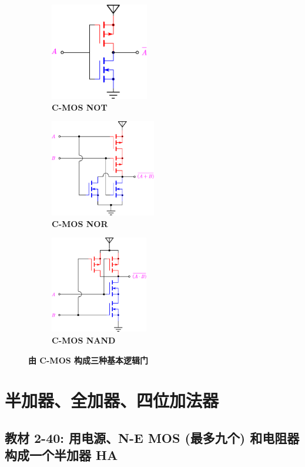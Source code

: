 \documentclass[UTF8]{report}
\theoremstyle{MyLineTheoremStyle} %
\theoremstyle{MyBlockTheoremStyle} %
\theoremstyle{MySubsubsectionStyle} %
\begin{document}
\begin{figure}[H]\centering
    \begin{subfigure}[t]{0.33\columnwidth}\centering
        \includegraphics[height=120pt]{assets/5/CMOS NOT.pdf}
        \caption{\bfseries C-MOS NOT }
    \end{subfigure}\hfill
    \begin{subfigure}[t]{0.33\columnwidth}\centering
        \includegraphics[height=120pt]{assets/5/CMOS NOR.pdf}
        \caption{\bfseries C-MOS NOR }
    \end{subfigure}
    \begin{subfigure}[t]{0.33\columnwidth}\centering
        \includegraphics[height=120pt]{assets/5/CMOS NAND.pdf}
        \caption{\bfseries C-MOS NAND }
    \end{subfigure}
    \caption{\bfseries 由 C-MOS 构成三种基本逻辑门 }\label{由 C-MOS 构成三种基本逻辑门}
\end{figure}


\section{半加器、全加器、四位加法器}

\subsection{教材 2-40: 用电源、N-E MOS (最多九个) 和电阻器构成一个半加器 HA}
\end{document}
